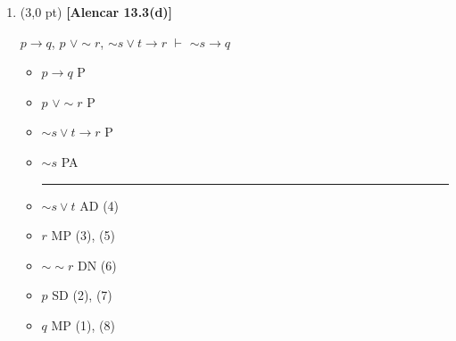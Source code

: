 \documentclass[12pt,a4paper,oneside]{article}
\begin{document}
\begin{enumerate}
\begin{enumerate}
		\item (3,0 pt) {\bf [Alencar 13.3(d)]} 
		\begin{center}
			$p \rightarrow q$, $p$ $\vee \sim r$, $\sim s \vee t \rightarrow r$ $\vdash$ $\sim s \rightarrow q$
		\end{center}
		{\color{blue}
			\begin{itemize}
				\item[(1)] $p \rightarrow q$ \hspace*{1.5cm} P
				\item[(2)] $p$ $\vee \sim r$ \hspace*{1.2cm} P
				\item[(3)] $\sim s \vee t \rightarrow r$ \hspace*{0.6cm} P
				\item[(4)] $\sim s$ \hspace*{2cm} PA\\
				\rule{3cm}{0.5pt}
				\item[(5)] $\sim s \vee t$ \hspace*{1.0cm} AD (4)
				\item[(6)] $r$ \hspace*{1.95cm} MP (3), (5)
				\item[(7)] $\sim \sim r$ \hspace*{1.2cm} DN (6)
				\item[(8)] $p$ \hspace*{1.9cm} SD (2), (7)
				\item[(9)] $q$ \hspace*{1.9cm} MP (1), (8)
			\end{itemize}
		}
		\vspace*{0.3cm}
		
	\end{enumerate}
	
	\newpage
	

\end{enumerate}
\end{document}
